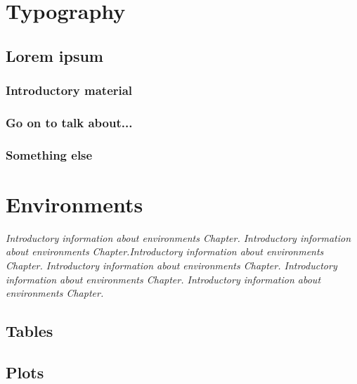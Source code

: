 \chapter{Typography}

\begin{main-points}%
	\item \lipsum[1]
	\item \lipsum[2]
	\item \lipsum[3]
\end{main-points}

\section{Lorem ipsum}

\lipsum[1]

\subsection{Introductory material}

\lipsum[2-3]

\subsection{Go on to talk about...}

\lipsum[4]

\subsection{Something else}

\lipsum[5-6]


\chapter{Environments}

{ \itshape
	Introductory information about environments Chapter. Introductory information about environments Chapter.Introductory information about environments Chapter. Introductory information about environments Chapter. Introductory information about environments Chapter. Introductory information about environments Chapter.
}

\section{Tables}





\section{Plots}



\begin{downloads}
\end{downloads}